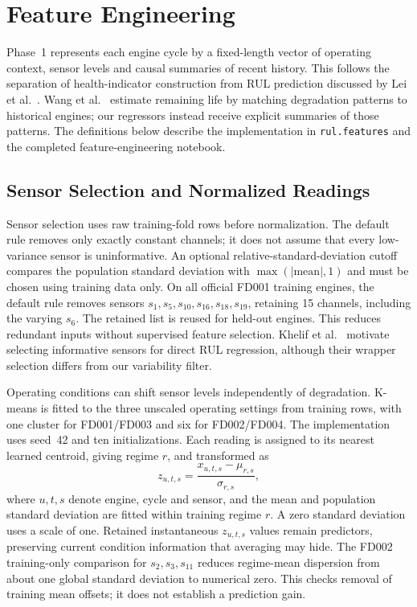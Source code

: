 
\section{Feature Engineering}
\label{sec:feature_engineering}

Phase~1 represents each engine cycle by a fixed-length vector of operating
context, sensor levels and causal summaries of recent history. This follows the
separation of health-indicator construction from RUL prediction discussed by
Lei et al.~\cite{Lei2018machinery}. Wang et al.~\cite{Wang2008similarity}
estimate remaining life by matching degradation patterns to historical engines;
our regressors instead receive explicit summaries of those patterns. The
definitions below describe the implementation in \texttt{rul.features} and the
completed feature-engineering notebook.

\subsection{Sensor Selection and Normalized Readings}
Sensor selection uses raw training-fold rows before normalization. The default
rule removes only exactly constant channels; it does not assume that every
low-variance sensor is uninformative. An optional relative-standard-deviation
cutoff compares the population standard deviation with
$\max(|\mathrm{mean}|,1)$ and must be chosen using training data only. On all
official FD001 training engines, the default rule removes sensors
$s_1,s_5,s_{10},s_{16},s_{18},s_{19}$, retaining 15 channels, including the
varying $s_6$. The retained list is reused for held-out engines. This reduces
redundant inputs without supervised feature selection. Khelif
et al.~\cite{Khelif2017direct} motivate selecting informative sensors for direct
RUL regression, although their wrapper selection differs from our variability
filter.

Operating conditions can shift sensor levels independently of degradation.
K-means is fitted to the three unscaled operating settings from training rows,
with one cluster for FD001/FD003 and six for FD002/FD004. The implementation
uses seed~42 and ten initializations. Each reading is assigned to its nearest
learned centroid, giving regime $r$, and transformed as
\begin{equation}
    z_{u,t,s}=\frac{x_{u,t,s}-\mu_{r,s}}{\sigma_{r,s}},
\end{equation}
where $u,t,s$ denote engine, cycle and sensor, and the mean and population
standard deviation are fitted within training regime $r$. A zero standard
deviation uses a scale of one. Retained instantaneous $z_{u,t,s}$ values remain
predictors, preserving current condition information that averaging may hide.
The FD002 training-only comparison for $s_2,s_3,s_{11}$ reduces regime-mean
dispersion from about one global standard deviation to numerical zero. This
checks removal of training mean offsets; it does not establish a prediction
gain.

